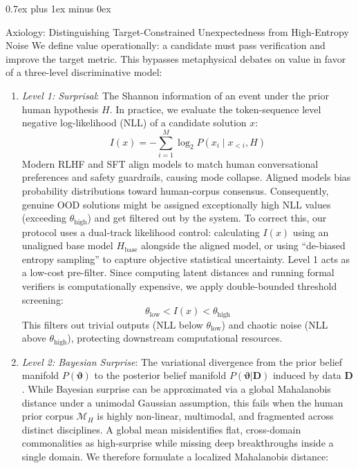 \documentclass[10pt,journal,compsoc]{IEEEtran}
\makeatletter
\renewcommand{\section}{\@startsection{section}{1}{\z@}{-3.5ex plus -2ex minus -1.5ex}%
{0.7ex plus 1ex minus 0ex}{\normalfont\sublargesize\sffamily\bfseries\scshape\raggedright}}
\makeatother
\begin{document}
\section{Axiology: Distinguishing Target-Constrained Unexpectedness from High-Entropy Noise}
We define value operationally: a candidate must pass verification and improve the target metric. This bypasses metaphysical debates on value in favor of a three-level discriminative model:
\begin{enumerate}
\item \textit{Level 1: Surprisal}: The Shannon information of an event under the prior human hypothesis $H$. In practice, we evaluate the token-sequence level negative log-likelihood (NLL) of a candidate solution $x$:
\begin{equation}
I(x) = -\sum_{i=1}^{M} \log_2 P(x_i \mid x_{<i}, H)
\end{equation}
Modern RLHF and SFT align models to match human conversational preferences and safety guardrails, causing mode collapse. Aligned models bias probability distributions toward human-corpus consensus. Consequently, genuine OOD solutions might be assigned exceptionally high NLL values (exceeding $\theta_{\text{high}}$) and get filtered out by the system.
To correct this, our protocol uses a dual-track likelihood control: calculating $I(x)$ using an unaligned base model $H_{\text{base}}$ alongside the aligned model, or using ``de-biased entropy sampling'' to capture objective statistical uncertainty.
Level 1 acts as a low-cost pre-filter. Since computing latent distances and running formal verifiers is computationally expensive, we apply double-bounded threshold screening:
\begin{equation}
\theta_{\text{low}} < I(x) < \theta_{\text{high}}
\end{equation}
This filters out trivial outputs (NLL below $\theta_{\text{low}}$) and chaotic noise (NLL above $\theta_{\text{high}}$), protecting downstream computational resources.
\item \textit{Level 2: Bayesian Surprise}: The variational divergence from the prior belief manifold $P(\boldsymbol{\vartheta})$ to the posterior belief manifold $P(\boldsymbol{\vartheta}|\mathbf{D})$ induced by data $\mathbf{D}$. While Bayesian surprise can be approximated via a global Mahalanobis distance under a unimodal Gaussian assumption, this fails when the human prior corpus $\mathcal{M}_H$ is highly non-linear, multimodal, and fragmented across distinct disciplines. A global mean misidentifies flat, cross-domain commonalities as high-surprise while missing deep breakthroughs inside a single domain. We therefore formulate a localized Mahalanobis distance:

\end{enumerate}
\end{document}
